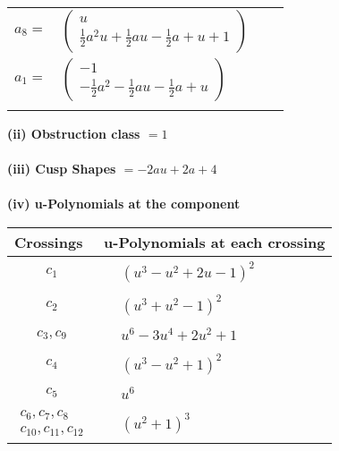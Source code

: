 \documentclass[1p]{elsarticle_modified}
\theoremstyle{definition}
\begin{document}
\begin{tabular}{m{7pt} m{180pt} m{7pt} m{180pt} }
\flushright $a_{8}=$&$\begin{pmatrix}u\\\frac{1}{2} a^2 u+\frac{1}{2} a u-\frac{1}{2} a+u+1\end{pmatrix}$ \\
\flushright $a_{1}=$&$\begin{pmatrix}-1\\-\frac{1}{2} a^2-\frac{1}{2} a u-\frac{1}{2} a+u\end{pmatrix}$\\&\end{tabular}
\flushleft \textbf{(ii) Obstruction class $= 1$}\\~\\
\flushleft \textbf{(iii) Cusp Shapes $= -2 a u+2 a+4$}\\~\\
\newpage\renewcommand{\arraystretch}{1}
\flushleft \textbf{(iv) u-Polynomials at the component}\newline \\
\begin{tabular}{m{50pt}|m{274pt}}
Crossings & \hspace{64pt}u-Polynomials at each crossing \\
\hline $$\begin{aligned}c_{1}\end{aligned}$$&$\begin{aligned}
&(u^3- u^2+2 u-1)^2
\end{aligned}$\\
\hline $$\begin{aligned}c_{2}\end{aligned}$$&$\begin{aligned}
&(u^3+u^2-1)^2
\end{aligned}$\\
\hline $$\begin{aligned}c_{3},c_{9}\end{aligned}$$&$\begin{aligned}
&u^6-3 u^4+2 u^2+1
\end{aligned}$\\
\hline $$\begin{aligned}c_{4}\end{aligned}$$&$\begin{aligned}
&(u^3- u^2+1)^2
\end{aligned}$\\
\hline $$\begin{aligned}c_{5}\end{aligned}$$&$\begin{aligned}
&u^6
\end{aligned}$\\
\hline $$\begin{aligned}c_{6},c_{7},c_{8}\\c_{10},c_{11},c_{12}\end{aligned}$$&$\begin{aligned}
&(u^2+1)^3
\end{aligned}$\\
\hline
\end{tabular}\\~\\
\end{document}
